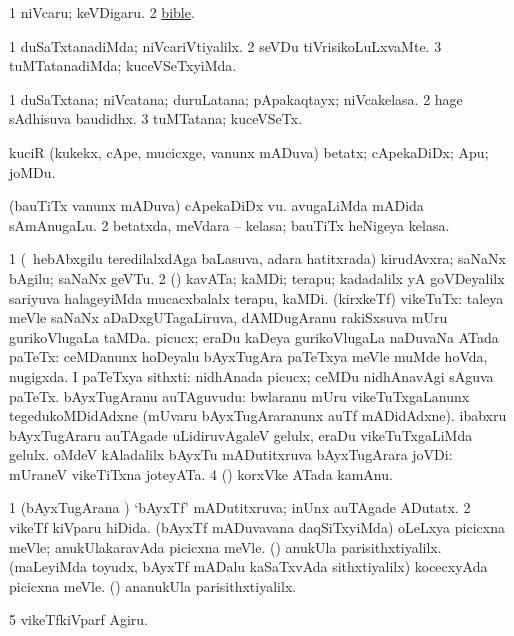 \noindent
\gl{\pagu}
\bmng
\bnum
\num{1}  niVcaru; keVDigaru. 
\num{2}  \hyperref{kandict_b.pdf}{B}{bible(3)}{bible}.
\enum
\emng
\eentry

\bentry
{}
\gl{\kirxvi}
\bmng
\bnum
\num{1} duSaTxtanadiMda; niVcariVtiyalilx. 
\num{2} seVDu tiVrisikoLuLxvaMte. 
\num{3} tuMTatanadiMda; kuceVSeTxyiMda. 
\enum
\emng
\eentry

\bentry
{}
\gl{\nA}
\bmng
\bnum
\num{1} duSaTxtana; niVcatana; duruLatana; pApakaqtayx; niVcakelasa. 
\num{2} hage sAdhisuva baudidhx. 
\num{3} tuMTatana; kuceVSeTx. 
\enum
\emng
\eentry

\bentry
{}
\gl{\nA}
\bmng
kuciR (kukekx, cApe, mucicxge, \mo vanunx mADuva) betatx; cApekaDiDx; Apu; joMDu. 
\emng
\eentry

\bentry
{}
\gl{\nA}
\bmng
\bnum
{} 
\banum
{} (bauTiTx \mo vanunx mADuva) cApekaDiDx \mo vu. 
 avugaLiMda mADida sAmAnugaLu. 
\eanum
\numie
\num{2} betatxda, meVdara -- kelasa; bauTiTx heNigeya kelasa. 
\enum
\emng
\eentry

\bentry
{} 
\gl{\nA}
\expl{}
\bmng
\bnum
\num{1} (\kanmu\ hebAbxgilu teredilalxdAga baLasuva, adara hatitxrada) kirudAvxra; saNaNx bAgilu; saNaNx geVTu. 
\num{2} (\ame) kavATa; kaMDi; terapu; kadadalilx yA goVDeyalilx sariyuva halageyiMda mucacxbalalx terapu, kaMDi. 
 (kirxkeTf) vikeTuTx: 
\banum
{} taleya meVle saNaNx aDaDxgUTagaLiruva, dAMDugAranu rakiSxsuva mUru gurikoVlugaLa taMDa. 
 picucx; eraDu kaDeya gurikoVlugaLa naDuvaNa ATada paTeTx:  ceMDanunx hoDeyalu bAyxTugAra paTeTxya meVle muMde hoVda, nugigxda. 
 I paTeTxya sithxti:  nidhAnada picucx; ceMDu nidhAnavAgi sAguva paTeTx. 
 bAyxTugAranu auTAguvudu:  bwlaranu mUru vikeTuTxgaLanunx tegedukoMDidAdxne (mUvaru bAyxTugAraranunx auTf mADidAdxne).  ibabxru bAyxTugAraru auTAgade uLidiruvAgaleV gelulx, eraDu vikeTuTxgaLiMda gelulx. 
 oMdeV kAladalilx bAyxTu mADutitxruva bAyxTugArara joVDi:  mUraneV vikeTiTxna joteyATa. 
\eanum
\numie
\num{4} (\ame) korxVke  ATada kamAnu. 
\enum
\emng

\noindent
\gl{\pagu}
\bmng
\bnum
\num{1}  (bAyxTugArana \vi) `bAyxTf' mADutitxruva; inUnx auTAgade ADutatx. 
\num{2}  vikeTf kiVparu hiDida. 
  
\banum
{} (bAyxTf mADuvavana daqSiTxyiMda) oLeLxya picicxna meVle; anukUlakaravAda picicxna meVle. 
 (\AmA) anukUla parisithxtiyalilx. 
\eanum
\numie
{}  
\banum
{} (maLeyiMda toyudx, bAyxTf mADalu kaSaTxvAda sithxtiyalilx) kocecxyAda picicxna meVle. 
 (\AmA) ananukUla parisithxtiyalilx. 
\eanum
\numie
\num{5}  vikeTfkiVparf Agiru. 
\enum
\emng
\eentry

